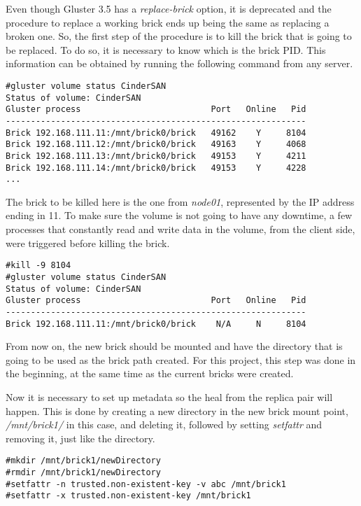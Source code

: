 Even though Gluster 3.5 has a \textit{replace-brick} option, it is deprecated and the procedure to replace a working brick ends up being the same as replacing a broken one. So, the first step of the procedure is to kill the brick that is going to be replaced. To do so, it is necessary to know which is the brick PID. This information can be obtained by running the following command from any server.

\begin{lstlisting}[frame=single]
#gluster volume status CinderSAN
Status of volume: CinderSAN
Gluster process                          Port   Online   Pid
------------------------------------------------------------
Brick 192.168.111.11:/mnt/brick0/brick   49162    Y     8104
Brick 192.168.111.12:/mnt/brick0/brick   49163    Y     4068
Brick 192.168.111.13:/mnt/brick0/brick   49153    Y     4211
Brick 192.168.111.14:/mnt/brick0/brick   49153    Y     4228
...
\end{lstlisting}

The brick to be killed here is the one from \textit{node01}, represented by the IP address ending in 11. To make sure the volume is not going to have any downtime, a few processes that constantly read and write data in the volume, from the client side, were triggered before killing the brick.

\begin{lstlisting}[frame=single]
#kill -9 8104
#gluster volume status CinderSAN
Status of volume: CinderSAN
Gluster process                          Port   Online   Pid
------------------------------------------------------------
Brick 192.168.111.11:/mnt/brick0/brick    N/A     N     8104
\end{lstlisting}

From now on, the new brick should be mounted and have the directory that is going to be used as the brick path created. For this project, this step was done in the beginning, at the same time as the current bricks were created.

Now it is necessary to set up metadata so the heal from the replica pair will happen. This is done by creating a new directory in the new brick mount point, \textit{/mnt/brick1/} in this case, and deleting it, followed by setting \textit{setfattr} and removing it, just like the directory.

\begin{lstlisting}[frame=single]
#mkdir /mnt/brick1/newDirectory
#rmdir /mnt/brick1/newDirectory
#setfattr -n trusted.non-existent-key -v abc /mnt/brick1
#setfattr -x trusted.non-existent-key /mnt/brick1
\end{lstlisting}

